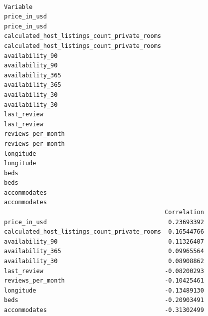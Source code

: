 \documentclass[
  journal,
]{IEEEtran}%
\begin{document}
\begin{verbatim}
                                                                                 Variable
price_in_usd                                                                 price_in_usd
calculated_host_listings_count_private_rooms calculated_host_listings_count_private_rooms
availability_90                                                           availability_90
availability_365                                                         availability_365
availability_30                                                           availability_30
last_review                                                                   last_review
reviews_per_month                                                       reviews_per_month
longitude                                                                       longitude
beds                                                                                 beds
accommodates                                                                 accommodates
                                             Correlation
price_in_usd                                  0.23693392
calculated_host_listings_count_private_rooms  0.16544766
availability_90                               0.11326407
availability_365                              0.09965564
availability_30                               0.08908862
last_review                                  -0.08200293
reviews_per_month                            -0.10425461
longitude                                    -0.13489130
beds                                         -0.20903491
accommodates                                 -0.31302499
\end{verbatim}
\end{document}
